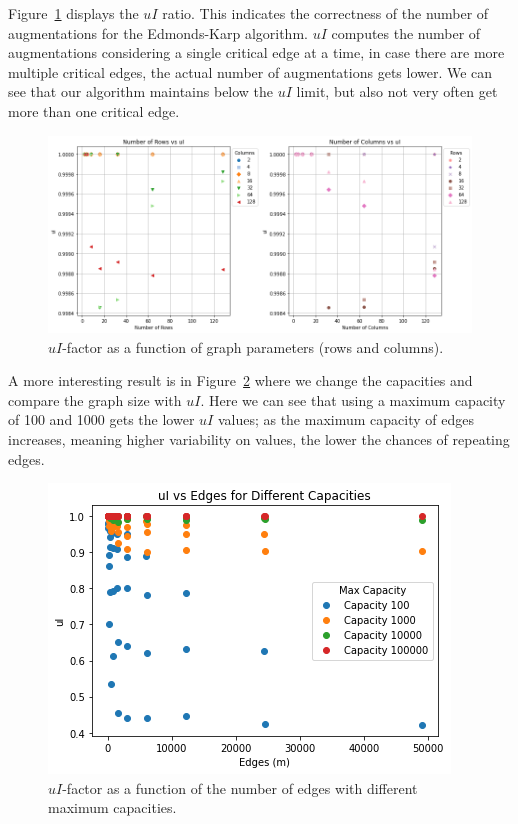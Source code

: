 \documentclass{article}
\begin{document}
Figure~\ref{fig:uIfactor} displays the \( uI \) ratio. This indicates the correctness of the number of augmentations for the Edmonds-Karp algorithm. \(uI\) computes the number of augmentations considering a single critical edge at a time, in case there are more multiple critical edges, the actual number of augmentations gets lower. We can see that our algorithm maintains below the \(uI\) limit, but also not very often get more than one critical edge.

\begin{figure}[H]
\centering
  \centering
  \includegraphics[width=1.0\linewidth]{uIfactor.png}
  \caption{$uI$-factor as a function of graph parameters (rows and columns).}
  \label{fig:uIfactor}
\end{figure}

A more interesting result is in Figure~\ref{fig:edges_uI} where we change the capacities and compare the graph size with \(uI\). Here we can see that using a maximum capacity of 100 and 1000 gets the lower \(uI\) values; as the maximum capacity of edges increases, meaning higher variability on values, the lower the chances of repeating edges. 

\begin{figure}[H]
\centering
  \centering
  \includegraphics[width=0.5\linewidth]{edges_uI.png}
  \caption{$uI$-factor as a function of the number of edges with different maximum capacities.}
  \label{fig:edges_uI}
\end{figure}
\end{document}
